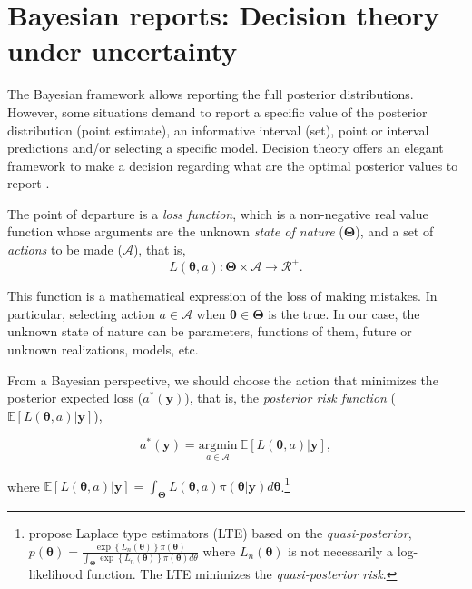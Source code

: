 \section{Bayesian reports: Decision theory under uncertainty}\label{sec14}

The Bayesian framework allows reporting the full posterior distributions. However, some situations demand to report a specific value of the posterior distribution (point estimate), an informative interval (set), point or interval predictions and/or selecting a specific model. Decision theory offers an elegant framework to make a decision regarding what are the optimal posterior values to report \cite{berger2013statistical}.

The point of departure is a \textit{loss function}, which is a non-negative real value function whose arguments are the unknown \textit{state of nature} ($\mathbf{\Theta}$), and a set of \textit{actions} to be made ($\mathcal{A}$), that is, 
\begin{equation*}
	L(\mathbf{\theta}, a):\mathbf{\Theta}\times \mathcal{A}\rightarrow \mathcal{R}^+.
\end{equation*}

This function is a mathematical expression of the loss of making mistakes. In particular, selecting action $a\in\mathcal{A}$ when $\mathbf{\theta}\in\mathbf{\Theta}$ is the true. In our case, the unknown state of nature can be parameters, functions of them, future or unknown realizations, models, etc.

From a Bayesian perspective, we should choose the action that minimizes the posterior expected loss ($a^*(\mathbf{y})$), that is, the \textit{posterior risk function} ($\mathbb{E}[L(\mathbf{\theta}, a)|\mathbf{y}]$),

\begin{equation*}
	a^*(\mathbf{y})=\underset{a \in \mathcal{A}}{\mathrm{argmin}} \  \mathbb{E}[L(\mathbf{\theta}, a)|\mathbf{y}], 
\end{equation*}

where $\mathbb{E}[L(\mathbf{\theta}, a)|\mathbf{y}]= \int_{\mathbf{\Theta}} L(\mathbf{\theta}, a)\pi(\mathbf{\theta}|\mathbf{y})d\mathbf{\theta}$.\footnote{\cite{Chernozhukov2003} propose Laplace type estimators (LTE) based on the \textit{quasi-posterior}, $p(\mathbf{\theta})=\frac{\exp\left\{L_n(\mathbf{\theta})\right\}\pi(\mathbf{\theta})}{\int_{\mathbf{\Theta}}\exp\left\{L_n(\mathbf{\theta})\right\}\pi(\mathbf{\theta})d\theta}$ where $L_n(\mathbf{\theta})$ is not necessarily a log-likelihood function. The LTE minimizes the \textit{quasi-posterior risk}.}

